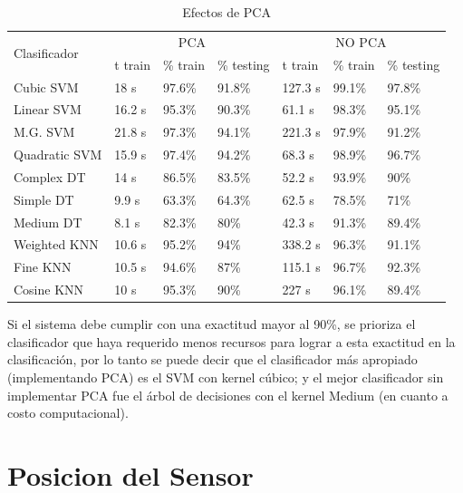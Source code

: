 \documentclass[11pt]{report}
\begin{document}
\begin{table}[H]
  \begin{tabular}{|l|l|l|l|l|l|l|}
    \hline
    \multirow{2}{*}{Clasificador} &
      \multicolumn{3}{c}{PCA} &
	\multicolumn{3}{|c|}{NO PCA} \\
    & t train  & \% train & \% testing & t train  & \% train & \% testing \\
    \hline
    Cubic SVM & 18 s & 97.6\% & 91.8\% & 127.3 s & 99.1\% & 97.8\% \\
    \hline
    Linear SVM & 16.2 s & 95.3\% & 90.3\% & 61.1 s & 98.3\% & 95.1\% \\
    \hline
    M.G. SVM & 21.8 s & 97.3\% & 94.1\% & 221.3 s & 97.9\% & 91.2\% \\
    \hline
Quadratic SVM & 15.9 s & 97.4\% & 94.2\% & 68.3 s & 98.9\% & 96.7\% \\
    \hline
    Complex DT & 14 s & 86.5\% & 83.5\% & 52.2 s & 93.9\% & 90\% \\
    \hline
    Simple DT & 9.9 s & 63.3\% & 64.3\% & 62.5 s & 78.5\% & 71\% \\
    \hline
Medium DT & 8.1 s & 82.3\% & 80\% & 42.3 s & 91.3\% & 89.4\% \\
    \hline
    Weighted KNN & 10.6 s & 95.2\% & 94\% & 338.2 s & 96.3\% & 91.1\% \\
    \hline
    Fine KNN & 10.5 s & 94.6\% & 87\% & 115.1 s & 96.7\% & 92.3\% \\
    \hline
Cosine KNN & 10 s & 95.3\% & 90\% & 227 s & 96.1\% & 89.4\% \\
    \hline
  \end{tabular}
\label{Efectos de PCA}
\caption{Efectos de PCA}
\end{table}

Si el sistema debe cumplir con una exactitud mayor al 90\%, se prioriza el clasificador que haya requerido menos recursos para lograr a esta exactitud en la clasificación, por lo tanto se puede decir que el clasificador más apropiado (implementando PCA) es el SVM con kernel cúbico; y el mejor clasificador sin implementar PCA fue el árbol de decisiones con el kernel Medium (en cuanto a costo computacional).


\section{Posicion del Sensor}
\end{document}

